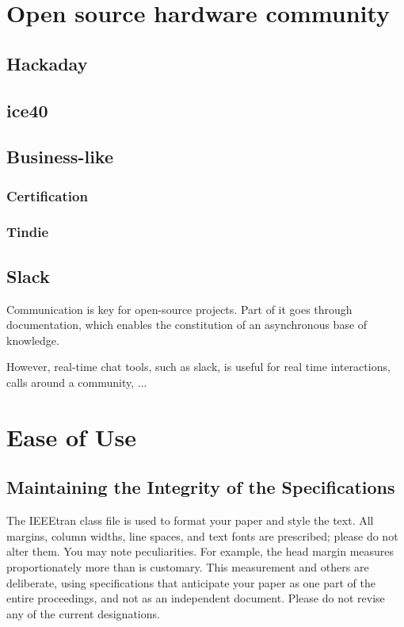 \documentclass[conference]{IEEEtran}
\begin{document}
\section{Open source hardware community}

\subsection{Hackaday}


\subsection{ice40}



\subsection{Business-like}



\subsubsection{Certification}



\subsubsection{Tindie}




\subsection{Slack}

Communication is key for open-source projects. Part of it goes through documentation, which enables the constitution of an asynchronous base of knowledge. 

However, real-time chat tools, such as slack, is useful for real time interactions, calls around a community, ...


\section{Ease of Use}

\subsection{Maintaining the Integrity of the Specifications}

The IEEEtran class file is used to format your paper and style the text. All margins, 
column widths, line spaces, and text fonts are prescribed; please do not 
alter them. You may note peculiarities. For example, the head margin
measures proportionately more than is customary. This measurement 
and others are deliberate, using specifications that anticipate your paper 
as one part of the entire proceedings, and not as an independent document. 
Please do not revise any of the current designations.
\end{document}
